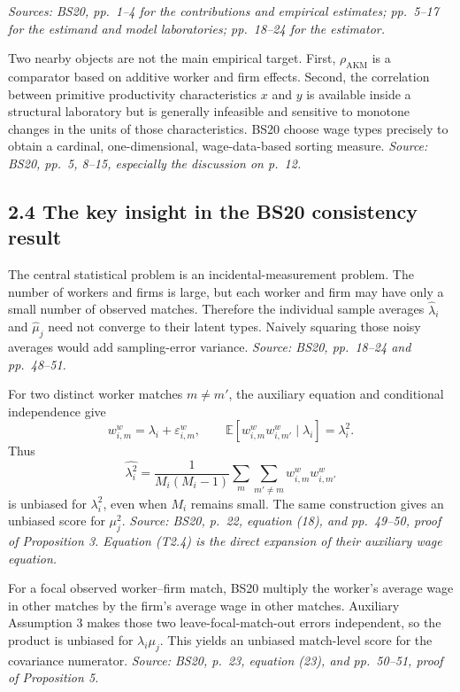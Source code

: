 \documentclass[11pt]{article}
\begin{document}
\textit{Sources: BS20, pp.\ 1--4 for the contributions and empirical
estimates; pp.\ 5--17 for the estimand and model laboratories; pp.\ 18--24 for
the estimator.}

Two nearby objects are not the main empirical target.  First,
\(\rho_{\mathrm{AKM}}\) is a comparator based on additive worker and firm
effects.  Second, the correlation between primitive productivity
characteristics \(x\) and \(y\) is available inside a structural laboratory
but is generally infeasible and sensitive to monotone changes in the units of
those characteristics.  BS20 choose wage types precisely to obtain a cardinal,
one-dimensional, wage-data-based sorting measure.
\textit{Source: BS20, pp.\ 5, 8--15, especially the discussion on p.\ 12.}

\subsection{2.4 The key insight in the BS20 consistency result}

The central statistical problem is an incidental-measurement problem.  The
number of workers and firms is large, but each worker and firm may have only a
small number of observed matches.  Therefore the individual sample averages
\(\widehat\lambda_i\) and \(\widehat\mu_j\) need not converge to their latent
types.  Naively squaring those noisy averages would add sampling-error
variance.  \textit{Source: BS20, pp.\ 18--24 and pp.\ 48--51.}

For two distinct worker matches \(m\ne m'\), the auxiliary equation and
conditional independence give
\[
w^w_{i,m}=\lambda_i+\varepsilon^w_{i,m},
\qquad
\mathbb E[
w^w_{i,m}w^w_{i,m'}\mid\lambda_i]
=\lambda_i^2.
\tag{T2.4}
\]
Thus
\[
\widehat{\lambda_i^2}
=
\frac{1}{M_i(M_i-1)}
\sum_m\sum_{m'\ne m}
w^w_{i,m}w^w_{i,m'}
\tag{T2.5}
\]
is unbiased for \(\lambda_i^2\), even when \(M_i\) remains small.  The same
construction gives an unbiased score for \(\mu_j^2\).
\textit{Source: BS20, p.\ 22, equation (18), and pp.\ 49--50, proof of
Proposition 3.  Equation (T2.4) is the direct expansion of their auxiliary
wage equation.}

For a focal observed worker--firm match, BS20 multiply the worker's average
wage in other matches by the firm's average wage in other matches.  Auxiliary
Assumption 3 makes those two leave-focal-match-out errors independent, so the
product is unbiased for \(\lambda_i\mu_j\).  This yields an unbiased match-level
score for the covariance numerator.
\textit{Source: BS20, p.\ 23, equation (23), and pp.\ 50--51, proof of
Proposition 5.}
\end{document}
